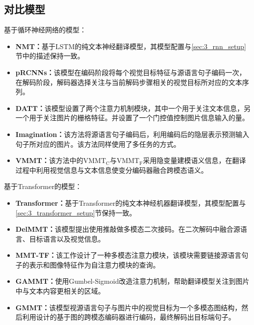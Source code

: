 \subsection{对比模型}
基于循环神经网络的模型：
\begin{itemize}
    \item \textbf{NMT：}基于LSTM的纯文本神经翻译模型，其模型配置与\ref{sec:3_rnn_setup}节中的描述保持一致。
    \item \textbf{pRCNNs\cite{35_huang-etal-2016-attention}：}该模型在编码阶段将每个视觉目标特征与源语言句子编码一次，在解码阶段，解码器选择关注与当前解码步骤相关的视觉目标所对应的文本序列。
    \item \textbf{DATT\cite{36_calixto-etal-2017-doubly}：}该模型设置了两个注意力机制模块，其中一个用于关注文本信息，另一个用于关注图片的栅格特征。并设置了一个门控值控制图片信息输入的量。
    \item \textbf{Imagination\cite{37_elliott-kadar-2017-imagination}：}该方法将源语言句子编码后，利用编码后的隐层表示预测输入句子所对应的图片。该方法同样使用了多任务的方式。
    \item \textbf{VMMT\cite{38_calixto-etal-2019-latent}：}该方法中的$ \mathrm{VMMT_C} $与$ \mathrm{VMMT_F} $采用隐变量建模语义信息，在翻译过程中利用视觉信息与文本信息使变分编码器融合跨模态语义。
\end{itemize}

基于Transformer的模型：
\begin{itemize}
    \item \textbf{Transformer：}基于Transformer的纯文本神经机器翻译模型，其模型配置与\ref{sec:3_transformer_setup}节保持一致。
    \item \textbf{DelMMT\cite{39_ive-etal-2019-distilling}：}该模型提出使用推敲做多模态二次接码。在二次解码中融合源语言、目标语言以及视觉信息。
    \item \textbf{MMT-TF\cite{40_yao-wan-2020-multimodal}：}该工作设计了一种多模态注意力模块，该模块需要链接源语言句子的表示和图像特征作为自注意力模块的查询。
    \item \textbf{GAMMT\cite{41_DBLP:journals/corr/abs-2103-08862}：}使用Gumbel-Sigmoid改造注意力机制，帮助翻译模型关注到图片中与文本内容更相关的区域。
    \item \textbf{GMMT\cite{33_yin-etal-2020-novel}：}该模型视源语言句子与图片中的视觉目标为一个多模态图结构，然后利用设计的基于图的跨模态编码器进行编码，最终解码出目标端句子。
\end{itemize}
